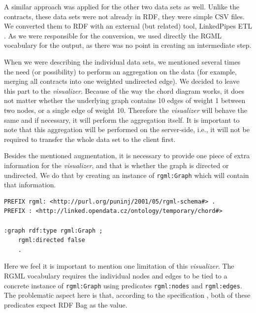 A similar approach was applied for the other two data sets as well. Unlike the contracts, these data sets were not already in RDF, they were simple CSV files. We converted them to RDF with an external (but related) tool, LinkedPipes ETL \cite{linkedpipes-etl}. As we were responsible for the conversion, we used directly the RGML vocabulary for the output, as there was no point in creating an intermediate step.

When we were describing the individual data sets, we mentioned several times the need (or possibility) to perform an aggregation on the data (for example, merging all contracts into one weighted undirected edge). We decided to leave this part to the \emph{visualizer}. Because of the way the chord diagram works, it does not matter whether the underlying graph contains 10 edges of weight 1 between two nodes, or a single edge of weight 10. Therefore the \emph{visualizer} will behave the same and if necessary, it will perform the aggregation itself. It is important to note that this aggregation will be performed on the server-side, i.e., it will not be required to transfer the whole data set to the client first. 

Besides the mentioned augmentation, it is necessary to provide one piece of extra information for the \emph{visualizer}, and that is whether the graph is directed or undirected. We do that by creating an instance of \texttt{rgml:Graph} which will contain that information.

\begin{verbatim}
PREFIX rgml: <http://purl.org/puninj/2001/05/rgml-schema#> .
PREFIX : <http://linked.opendata.cz/ontology/temporary/chord#>

:graph rdf:type rgml:Graph ;
    rgml:directed false
    .
\end{verbatim}

Here we feel it is important to mention one limitation of this \emph{visualizer}. The RGML vocabulary requires the individual nodes and edges to be tied to a concrete instance of \texttt{rgml:Graph} using predicates \texttt{rgml:nodes} and \texttt{rgml:edges}. The problematic aspect here is that, according to the specification \cite{rgml}, both of these predicates expect RDF Bag as the value.

